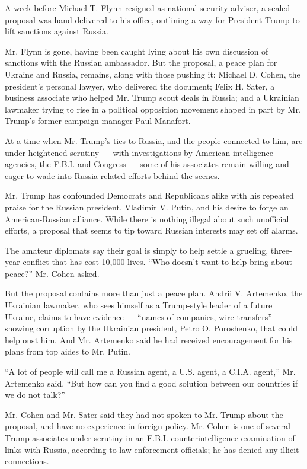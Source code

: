 A week before Michael T. Flynn resigned as national security adviser, a
sealed proposal was hand-delivered to his office, outlining a way for
President Trump to lift sanctions against Russia.

Mr. Flynn is gone, having been caught lying about his own discussion of
sanctions with the Russian ambassador. But the proposal, a peace plan
for Ukraine and Russia, remains, along with those pushing it: Michael D.
Cohen, the president's personal lawyer, who delivered the document;
Felix H. Sater, a business associate who helped Mr. Trump scout deals in
Russia; and a Ukrainian lawmaker trying to rise in a political
opposition movement shaped in part by Mr. Trump's former campaign
manager Paul Manafort.

At a time when Mr. Trump's ties to Russia, and the people connected to
him, are under heightened scrutiny --- with investigations by American
intelligence agencies, the F.B.I. and Congress --- some of his
associates remain willing and eager to wade into Russia-related efforts
behind the scenes.

Mr. Trump has confounded Democrats and Republicans alike with his
repeated praise for the Russian president, Vladimir V. Putin, and his
desire to forge an American-Russian alliance. While there is nothing
illegal about such unofficial efforts, a proposal that seems to tip
toward Russian interests may set off alarms.

The amateur diplomats say their goal is simply to help settle a
grueling, three-year
\href{https://www.nytimes.com/2017/02/03/world/europe/ukraine-russia-conflict-avdiivka.html}{conflict}
that has cost 10,000 lives. ``Who doesn't want to help bring about
peace?'' Mr. Cohen asked.

But the proposal contains more than just a peace plan. Andrii V.
Artemenko, the Ukrainian lawmaker, who sees himself as a Trump-style
leader of a future Ukraine, claims to have evidence --- ``names of
companies, wire transfers'' --- showing corruption by the Ukrainian
president, Petro O. Poroshenko, that could help oust him. And Mr.
Artemenko said he had received encouragement for his plans from top
aides to Mr. Putin.

``A lot of people will call me a Russian agent, a U.S. agent, a C.I.A.
agent,'' Mr. Artemenko said. ``But how can you find a good solution
between our countries if we do not talk?''

Mr. Cohen and Mr. Sater said they had not spoken to Mr. Trump about the
proposal, and have no experience in foreign policy. Mr. Cohen is one of
several Trump associates under scrutiny in an F.B.I. counterintelligence
examination of links with Russia, according to law enforcement
officials; he has denied any illicit connections.

